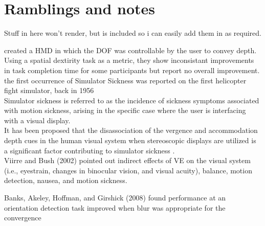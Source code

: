 \section{Ramblings and notes}
Stuff in here won't render, but is included so i can easily add them in as required.

\cite{Toyoura:2012:MPD:2407516.2407526} created a HMD in which the DOF was controllable by the user to convey depth. Using a spatial dextirity task as a metric, they show inconsistant improvements in task completion time for some participants but report no overall improvement.\\


the first occurrence of Simulator Sickness was reported on the first helicopter fight simulator, back in 1956 \cite{miller}\\

	Simulator sickness is referred to as the incidence of sickness symptoms associated with motion sickness, arising in the specific case where the user is interfacing with a visual display\cite{johnson}. \\


	

	It has been proposed that the disassociation of the vergence and accommodation depth cues in the human visual system when stereoscopic displays are utilized is a significant factor contributing to simulator sickness \cite{howard:depthPerception}. \\  

	
Viirre and Bush (2002) pointed out indirect effects of VE on the 
visual system (i.e., eyestrain, changes in binocular vision, and 
visual acuity), balance, motion detection, nausea, and motion 
sickness.


	
	
 Banks, Akeley, Hoffman, and Girshick (2008) found performance at an orientation detection task improved when blur was appropriate for the convergence 